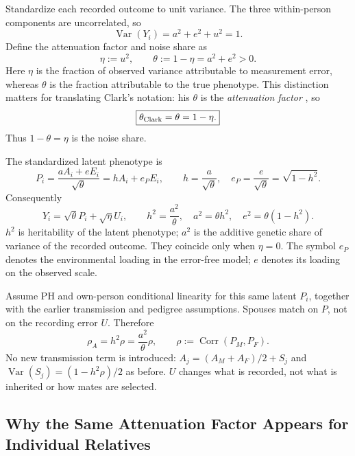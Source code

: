 Standardize each recorded outcome to unit variance. The three
within-person components are uncorrelated, so
\[
 \operatorname{Var}(Y_i)=a^2+e^2+u^2=1.
\]
Define the attenuation factor and noise share as
\begin{equation}
 \eta:=u^2,\qquad
 \theta:=1-\eta=a^2+e^2>0.
 \label{eq:me-shares}
\end{equation}
Here $\eta$ is the fraction of observed variance attributable to
measurement error, whereas $\theta$ is the fraction attributable to
the true phenotype. This distinction matters for translating Clark's
notation: his $\theta$ is the \emph{attenuation factor}
\citep[p.~42 and Table~A1]{Clark2026}, so
\[
 \boxed{\theta_{\rm Clark}=\theta=1-\eta.}
\]
Thus $1-\theta=\eta$ is the noise share.

The standardized latent phenotype is
\begin{equation}
 P_i=\frac{aA_i+eE_i}{\sqrt{\theta}}
     =hA_i+e_P E_i,\qquad
 h=\frac{a}{\sqrt{\theta}},\quad
 e_P=\frac{e}{\sqrt{\theta}}=\sqrt{1-h^2}.
 \label{eq:me-latent}
\end{equation}
Consequently
\[
 Y_i=\sqrt{\theta}P_i+\sqrt{\eta}U_i,\qquad
 h^2=\frac{a^2}{\theta},\quad
 a^2=\theta h^2,\quad e^2=\theta(1-h^2).
\]
$h^2$ is heritability of the latent phenotype; $a^2$ is the additive
genetic share of variance of the recorded outcome. They coincide only
when $\eta=0$. The symbol $e_P$ denotes the environmental loading in
the error-free model; $e$ denotes its loading on the observed scale.

Assume PH and own-person conditional linearity for this same latent
$P_i$, together with the earlier transmission and pedigree assumptions.
Spouses match on $P$, not on the recording error $U$. Therefore
\begin{equation}
 \rho_A=h^2\rho=\frac{a^2}{\theta}\rho,\qquad
 \rho:=\operatorname{Corr}(P_M,P_F).
 \label{eq:me-spouse-restriction}
\end{equation}
No new transmission term is introduced: $A_j=(A_M+A_F)/2+S_j$ and
$\operatorname{Var}(S_j)=(1-h^2\rho)/2$ as before. $U$ changes what is
recorded, not what is inherited or how mates are selected.

\subsection{Why the Same Attenuation Factor Appears for Individual Relatives}
\label{sec:me-attenuation}

